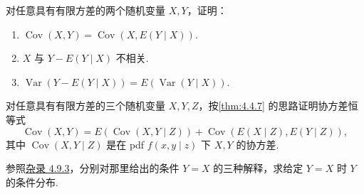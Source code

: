 \begin{exercise}\label{exercise:4.58}
对任意具有有限方差的两个随机变量 $X,Y$，证明：
\begin{enumerate}
\item[(a)] $\operatorname{Cov}(X,Y)=\operatorname{Cov}(X,E(Y\mid X))$.
\item[(b)] $X$ 与 $Y-E(Y\mid X)$ 不相关.
\item[(c)] $\operatorname{Var}(Y-E(Y\mid X))=E(\operatorname{Var}(Y\mid X))$.
\end{enumerate}
\end{exercise}
\begin{exercise}\label{exercise:4.59}
对任意具有有限方差的三个随机变量 $X,Y,Z$，按\autoref{thm:4.4.7} 的思路证明协方差恒等式
$$\operatorname{Cov}(X,Y)=E(\operatorname{Cov}(X,Y\mid Z))+\operatorname{Cov}(E(X\mid Z),E(Y\mid Z)),$$
其中 $\operatorname{Cov}(X,Y\mid Z)$ 是在 pdf $f(x,y\mid z)$ 下 $X,Y$ 的协方差.
\end{exercise}
\begin{exercise}\label{exercise:4.60}
参照\hyperref[misc:4.9.3]{杂录 4.9.3}，分别对那里给出的条件 $Y=X$ 的三种解释，求给定 $Y=X$ 时 $Y$ 的条件分布.
\end{exercise}

